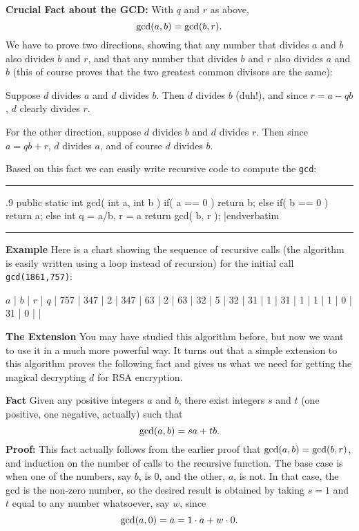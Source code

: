 {\bf Crucial Fact about the GCD:}  With $q$ and $r$ as above,
$$\hbox{gcd}(a,b) = \hbox{gcd}(b,r).$$
We have to prove two directions, showing that any number that divides $a$ and $b$ also divides $b$ and $r$, 
and that any number that divides $b$ and $r$ also divides $a$ and $b$ (this of course proves that the two 
greatest common divisors are the same):
\medskip

Suppose $d$ divides $a$ and $d$ divides $b$.  Then $d$ divides $b$ (duh!), and since
$r = a-qb$, $d$ clearly divides $r$.
\medskip

For the other direction, suppose $d$ divides $b$ and $d$ divides $r$.  Then since $a = qb+r$, $d$ divides $a$,
and of course $d$ divides $b$.
\bigskip
\Out 

\vfil\eject

Based on this fact we can easily write recursive code to compute the {\tt gcd}:
\medskip
\hrule
\smallskip
{\baselineskip .9\baselineskip
\verbatim
public static int gcd( int a, int b )
{
  if( a == 0 )  return b;
  else if( b == 0 )  return a;
  else{
    int q = a/b, r = a%
    return gcd( b, r );
  }
}
|endverbatim
\smallskip}
\hrule
\medskip

{\bf Example}  Here is a chart showing the sequence of recursive calls (the algorithm is easily
written using a loop instead of recursion) for the initial call {\tt gcd(1861,757)}:
\medskip

$a$ | $b$ | $r$ | $q$   | 757 | 347 | 2  | 347 | 63 | 2   | 63 | 32 | 5 | 32 | 31 | 1  | 31 | 1 | 1  | 1 | 0  | 31  | 0 | | 
\endruledtable
\border

{\bf The Extension}
\medskip
You may have studied this algorithm before, but now we want to use it in a much more
powerful way.  It turns out that a simple extension to this algorithm proves the following fact
and gives us what we need for getting the magical decrypting $d$ for RSA encryption.
\medskip

{\bf Fact}  Given any positive integers $a$ and $b$, there exist integers $s$ and $t$
 (one positive, one
negative, actually) such that 
$$
\hbox{gcd}(a,b) = s a + t b.
$$
\In
{\bf Proof:}  This fact actually follows from the earlier proof that $\hbox{gcd}(a,b) = \hbox{gcd}(b,r)$,
and induction on the number of calls to the recursive function.  
\medskip
The base case is when one of the numbers, say $b$, is 0, and the other, $a$, is not.
In that case, the gcd is the non-zero number, so the desired result is obtained by taking
$s=1$ and $t$ equal to any number whatsoever, say $w$, since
$$ \hbox{gcd}(a,0) = a = 1 \cdot a + w \cdot 0.
$$

